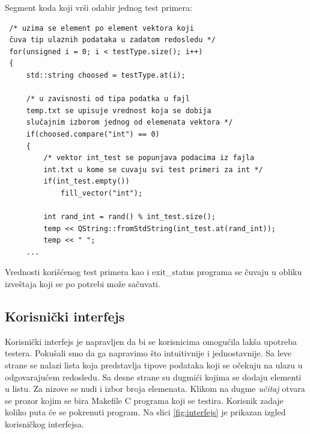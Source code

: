 \documentclass[a4paper]{article}
\begin{document}
{Segment koda koji vrši odabir jednog test primera:
\begin{verbatim}
 /* uzima se element po element vektora koji 
 čuva tip ulaznih podataka u zadatom redosledu */
 for(unsigned i = 0; i < testType.size(); i++)
 {
     std::string choosed = testType.at(i);
     
     /* u zavisnosti od tipa podatka u fajl 
     temp.txt se upisuje vrednost koja se dobija 
     slučajnim izborom jednog od elemenata vektora */
     if(choosed.compare("int") == 0)
     {
         /* vektor int_test se popunjava podacima iz fajla
         int.txt u kome se cuvaju svi test primeri za int */
         if(int_test.empty())
             fill_vector("int"); 
                  
         int rand_int = rand() % int_test.size();
         temp << QString::fromStdString(int_test.at(rand_int));
         temp << " ";
     ...
 \end{verbatim}
 
Vrednosti korišćenog test primera kao i exit\_status programa se čuvaju u obliku izveštaja koji se po potrebi može sačuvati.

\subsection{Korisnički interfejs}
\label{subsec:korisnicki_interfejs_testera}

Korisnički interfejs je napravljen da bi se korisnicima omogućila lakša upotreba testera. Pokušali smo da ga napravimo što intuitivnije i jednostavnije. Sa leve strane se nalazi lista koja predstavlja tipove podataka koji se očekuju na ulazu u odgovarajućem redosledu. Sa desne strane su dugmići kojima se dodaju elementi u listu. Za nizove se nudi i izbor broja elemenata. Klikom na dugme \textit{učitaj} otvara se prozor kojim se bira Makefile C programa koji se testira. Korisnik zadaje koliko puta će se pokrenuti program. Na slici \ref{fig:interfejs} je prikazan izgled korisničkog interfejsa. \\

}
\end{document}
